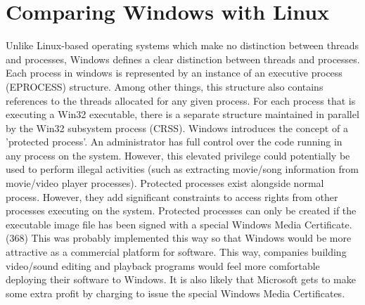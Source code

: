 \documentclass[onecolumn,10pt]{IEEETran}
\begin{document}
\section{Comparing Windows with Linux}
Unlike Linux-based operating systems which make no distinction between threads and processes, Windows defines a clear distinction between threads and processes.  Each process in windows is represented by an instance of an executive process (EPROCESS) structure.  Among other things, this structure also contains references to the threads allocated for any given process.  For each process that is executing a Win32 executable, there is a separate structure maintained in parallel by the Win32 subsystem process (CRSS).
	Windows introduces the concept of a 'protected process'.  An administrator has full control over the code running in any process on the system.  However, this elevated privilege could potentially be used to perform illegal activities (such as extracting movie/song information from movie/video player processes).  Protected processes exist alongside normal process.  However, they add significant constraints to access rights from other processes executing on the system.  Protected processes can only be created if the executable image file has been signed with a special Windows Media Certificate. (368)  This was probably implemented this way so that Windows would be more attractive as a commercial platform for software.  This way, companies building video/sound editing and playback programs would feel more comfortable deploying their software to Windows.  It is also likely that Microsoft gets to make some extra profit by charging to issue the special Windows Media Certificates.
\end{document}
